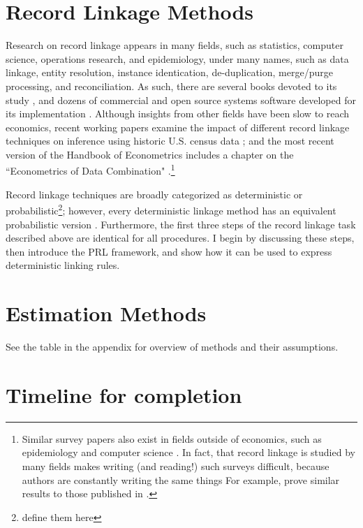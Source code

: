 \documentclass[12pt]{article}
\begin{document}
\section{Record Linkage Methods}

Research on record linkage appears in many fields, such as statistics, computer science, operations research, and epidemiology, under many names, such as data linkage, entity resolution, instance identication, de-duplication, merge/purge processing, and reconciliation.  As such, there are several books devoted to its study \citep{harron_book, christen2012, herzog07}, and dozens of commercial and open source systems software developed for its implementation \citep{kopcke2010}.  Although insights from other fields have been slow to reach economics, recent working papers examine the impact of different record linkage techniques on inference using historic U.S. census data \citep{abe2019, bailey2017}; and the most recent version of the Handbook of Econometrics includes a chapter on the ``Econometrics of Data Combination" \citep{RidderMoffitt}.\footnote{Similar survey papers also exist in fields outside of economics, such as epidemiology and computer science \citep{harron2018, winkler99}.  In fact, that record linkage is studied by many fields makes writing (and reading!) such surveys difficult, because authors are constantly writing the same things For example, \cite{Goldstein2012} prove similar results to those published in \cite{hirukawa2018}.}

Record linkage techniques are broadly categorized as deterministic or probabilistic\footnote{define them here}; however, every deterministic linkage method has an equivalent probabilistic version \citep{harron2018}.  Furthermore, the first three steps of the record linkage task described above are identical for all procedures.  I begin by discussing these steps, then introduce the PRL framework, and show how it can be used to express deterministic linking rules. 

\section{Estimation Methods}

See the table in the appendix for overview of methods and their assumptions. 

\section{Timeline for completion}
\end{document}

